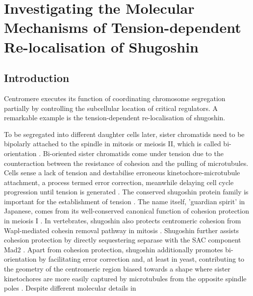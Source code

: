 \chapter{Investigating the Molecular Mechanisms of Tension-dependent Re-localisation of Shugoshin}

\section{Introduction}
Centromere executes its function of coordinating chromosome segregation partially by controlling the subcellular location of critical regulators. A remarkable example is the tension-dependent re-localisation of shugoshin. 

To be segregated into different daughter cells later, sister chromatids need to be bipolarly attached to the spindle in mitosis or meiosis II, which is called bi-orientation \citep{Tanaka2010Kinetochore-microtubuleBi-orientation}. Bi-oriented sister chromatids come under tension due to the counteraction between the resistance of cohesion and the pulling of microtubules. Cells sense a lack of tension and destabilise erroneous kinetochore-microtubule attachment, a process termed error correction, meanwhile delaying cell cycle progression until tension is generated \citep{Nicklas1997HowChromosomes, Nicklas1994, Tanaka2010Kinetochore-microtubuleBi-orientation}. The conserved shugoshin protein family is important for the establishment of tension \citep{Watanabe2005, Clift2011, Gutierrez-Caballero2012Shugoshins:Centromere, Marston2015, Zhang2020FunctioningMitosis}. The name itself, 'guardian spirit' in Japanese, comes from its well-conserved canonical function of cohesion protection in meiosis I \citep{Lister2010Age-relatedSgo2, Llano2008Shugoshin-2Mice, Lee2008, Rattani2013Sgol2Oocytes, Marston2004a, Kitajima2004a, Katis2004, Rabitsch2004TwoII, Kerrebrock1992TheDifferentiation, Cromer2013CentromericInterkinesis, Zamariola2014SHUGOSHINsThaliana, Wang2011OsSGO1Meiosis, Hamant2005AFunctions, Ma2021MeikinI, Miyazaki2017HierarchicalI}. In vertebrates, shugoshin also protects centromeric cohesion from Wapl-mediated cohesin removal pathway in mitosis \citep{Rivera2009ShugoshinExtracts, Shintomi2009ReleasingSgo1, Huang2007, Tang2006a, McGuinness2005ShugoshinCells, Kitajima2005, Salic2004VertebrateMitosis, Liang2019ACells}. Shugoshin further assists cohesion protection by directly sequestering separase with the SAC component Mad2 \citep{Rattani2013Sgol2Oocytes, Hellmuth2020Securin-independentShugoshinMAD2, Orth2011ShugoshinMad2}. Apart from cohesion protection, shugoshin additionally promotes bi-orientation by facilitating error correction \citep{Meppelink2015Shugoshin-1Bi-orientation, Huang2007, Peplowska2014, Nerusheva2014, Verzijlbergen2014, Tsukahara2010a, Yamagishi2010, Hadders2020UntanglingMitosis, Broad2020AuroraCells, Kawashima2007, Vanoosthuyse2007, Rivera2012} and, at least in yeast, contributing to the geometry of the centromeric region biased towards a shape where sister kinetochores are more easily captured by microtubules from the opposite spindle poles \citep{Indjeian2007, Haase2012Bub1Dynamics, Verzijlbergen2014, Peplowska2014, Sane2021ShugoshinDisassembly}. Despite different molecular details in 